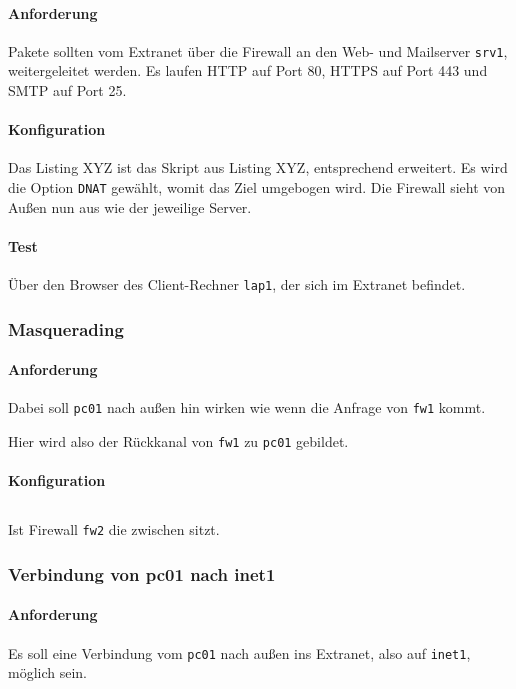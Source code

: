 \paragraph{Anforderung} Pakete sollten vom Extranet über die Firewall an
den Web- und Mailserver {\tt srv1}, weitergeleitet werden.
Es laufen HTTP auf Port 80, HTTPS auf Port 443 und SMTP auf Port 25.

\paragraph{Konfiguration} Das Listing XYZ ist das Skript
aus Listing XYZ, entsprechend erweitert.
Es wird die Option {\tt DNAT} gewählt, womit das Ziel umgebogen wird.
Die Firewall sieht von Außen nun aus wie der jeweilige Server.


\paragraph{Test} Über den Browser des Client-Rechner {\tt lap1},
der sich im Extranet befindet.


\subsubsection{Masquerading}

\paragraph{Anforderung}
Dabei soll {\tt pc01} nach außen hin wirken wie wenn die Anfrage von
{\tt fw1} kommt.

Hier wird also der Rückkanal von {\tt fw1} zu {\tt pc01} gebildet.

\paragraph{Konfiguration}


\subsection{\fwb}

Ist Firewall {\tt fw2} die zwischen \fwb sitzt.

\subsubsection{Verbindung von pc01 nach inet1}

\paragraph{Anforderung} Es soll eine Verbindung vom {\tt pc01} nach
außen ins Extranet, also auf {\tt inet1}, möglich sein.



